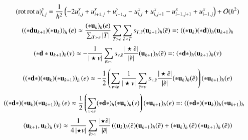 \documentclass[15pt,t,aspectratio=1610]{beamer}
\begin{document}
\begin{frame}
\begin{overprint}
        \begin{align*}
          (\operatorname{rot}\operatorname{rot} u)^{y}_{i,j} &=
	          \frac{1}{h^{2}}\left(  - 2u^{y}_{i,j} + u^{y}_{i+1,j} +  u^{y}_{i-1,j}
						-u^{x}_{i,j} + u^{x}_{i,j+1}
						-u^{x}_{i-1,j+1} +u^{x}_{i-1,j} \right) + \mathcal{O}(h^{2})
        \end{align*}
        \begin{align*}
          \left((* \mathbf{d} \mathbf{u}_{k+1})(*\mathbf{u}_{k})\right)_{h}(e) &\approx \frac{(*\mathbf{u}_{k})_{h}(e)}{\sum_{T\succ e}|T|}
          \sum_{T\succ e}\sum_{\tilde{e}\prec T}s_{T,\tilde{e}}(\mathbf{u}_{k+1})_{h}(\tilde{e})
            =:((* \mathbf{u}_{k})(* \mathbf{d} ))_{h}(\mathbf{u}_{k+1})_{h}
        \end{align*}
          \begin{align*}
            (*\mathbf{d} * \mathbf{u}_{k+1})_{h}(v) &\approx -\frac{1}{|\star v|}\sum_{\tilde{e}\succ v}s_{v,\tilde{e}}\frac{|\star \tilde{e}|}{|\tilde{e}|}(\mathbf{u}_{k+1})_{h}(\tilde{e})
              =: (*\mathbf{d} *)_{h} (\mathbf{u}_{k+1})_{h}(v)
          \end{align*}
        \begin{align*}
          \left((*\mathbf{d} * )(*\mathbf{u}_{k})(* \mathbf{u}_{k+1})\right)_{h}(e) &\approx -\frac{1}{2}\left( \sum_{v\prec e} \frac{1}{|\star v|}\sum_{\tilde{e}\succ v}
                        s_{v,\tilde{e}}\frac{|\star \tilde{e}|}{|\tilde{e}|}(*\mathbf{u}_{k})_{h}(\tilde{e}) \right) (*\mathbf{u}_{k+1})_{h}(e)
        \end{align*}
        \begin{align*}
          \hspace{-10pt}
          \left((*\exd * )(*\ub_{k})(* \ub_{k+1})\right)_{h}(e) &\approx \frac{1}{2}\left( \sum_{v\prec e} (*\exd*)_{h}(*\ub_{k})_{h}(v)\right) (*\ub_{k+1})_{h}(e)
              =: ((*\exd * )(* \ub_{k}))_{h}(* \ub_{k+1})_{h}
        \end{align*}
        \begin{align*}
          \left\langle \mathbf{u}_{k+1} , \mathbf{u}_{k} \right\rangle_{h}(v)
              &\approx \frac{1}{4\left| \star v \right|}\sum_{\tilde{e}\succ v} 
              \frac{\left| \star \tilde{e} \right|}{\left| \tilde{e} \right|} \left( (\mathbf{u}_{k})_{h}(\tilde{e}) (\mathbf{u}_{k+1})_{h}(\tilde{e}) 
                                                          + \left( *\mathbf{u}_{k} \right)_{h}(\tilde{e}) \left( *\mathbf{u}_{k+1} \right)_{h}(\tilde{e}) \right)
        \end{align*}
    \end{overprint}
  \end{frame}
\end{document}
